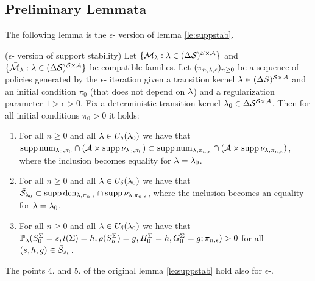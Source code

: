 \subsection{Preliminary Lemmata}
The following lemma is the $\epsilon$-\eUDRL{} version of lemma \ref{le:suppstab}.

\begin{lemma}\label{le:esuppstab} ($\epsilon$-\eUDRL{} version of support stability)
Let $\{\mathcal{M}_{\mathit{\lambda}} : \mathit{\lambda} \in (\Delta \mathcal{S})^{\mathcal{S}\times\mathcal{A}}\}$
and $\{\bar{\mathcal{M}}_{\mathit{\lambda}} : \mathit{\lambda} \in (\Delta \mathcal{S})^{\mathcal{S}\times\mathcal{A}}\}$ be compatible families.
Let $(\pi_{n,\mathit{\lambda},\epsilon})_{n\geq 0}$ be a sequence of 
policies generated by the $\epsilon$-\eUDRL{} iteration given a transition kernel $\mathit{\lambda}\in (\Delta S)^{\mathcal{S}\times\mathcal{A}}$ and  an initial condition $\pi_0$ (that does not depend on $\mathit{\lambda}$) and a regularization parameter $1> \epsilon >0$.
Fix a deterministic transition kernel $\mathit{\lambda}_0 \in \Delta \mathcal{S}^{\mathcal{S}\times\mathcal{A}}$.
Then for all initial conditions $\pi_0 > 0$ it
holds:
\begin{enumerate}
    \item For all $n\geq 0$ and all $\mathit{\lambda} \in U_{\delta}(\mathit{\lambda}_0)$ we have that $\operatorname*{\mathrm{supp}} \mathrm{num}_{\mathit{\lambda}_0,\pi_0} \cap ( \mathcal{A} \times \operatorname*{\mathrm{supp}} \nu_{\mathit{\lambda}_0,\pi_0} ) \subset \operatorname*{\mathrm{supp}} \mathrm{num}_{\mathit{\lambda},\pi_{n,\epsilon}} \cap ( \mathcal{A} \times \operatorname*{\mathrm{supp}} \nu_{\mathit{\lambda},\pi_{n,\epsilon}} )$,
    where the inclusion becomes equality for $\mathit{\lambda} = \mathit{\lambda}_0$.
    \item For all $n\geq 0$ and all $\mathit{\lambda} \in U_{\delta}(\mathit{\lambda}_0)$ we have that $\bar{\mathcal{S}}_{\mathit{\lambda}_0} \subset \operatorname*{\mathrm{supp}} \mathrm{den}_{\mathit{\lambda},\pi_{n,\epsilon}} \cap \operatorname*{\mathrm{supp}} \nu_{\mathit{\lambda},\pi_{n,\epsilon}}$,
    where the inclusion becomes an equality for $\mathit{\lambda} = \mathit{\lambda}_0$.
    \item For all $n\geq 0$ and all $\mathit{\lambda} \in U_{\delta}(\mathit{\lambda}_0)$ we have that $\mathbb{P}_{\mathit{\lambda}} (S^{\Sigma}_0=s, l(\Sigma)=h, \rho(S^{\Sigma}_h)=g, H^{\Sigma}_0=h, G^{\Sigma}_0=g; \pi_{n,\epsilon} ) > 0$ for all $(s,h,g)\in \bar{\mathcal{S}}_{\mathit{\lambda}_0}$.   
\end{enumerate}
The points 4. and 5. of the original lemma \ref{le:suppstab} hold also for $\epsilon$-\eUDRL{}.
\end{lemma}

